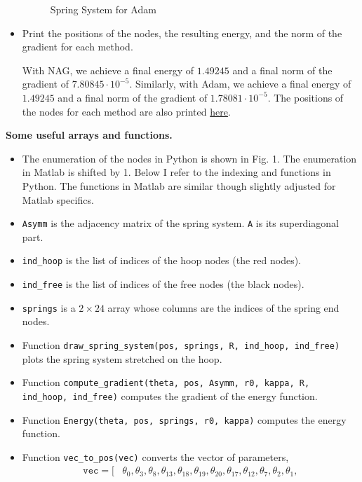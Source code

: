 \documentclass{../kin_math}
\begin{document}
\begin{questions}
\begin{itemize}
\begin{solution}
\begin{figure}
        \caption{Spring System for Adam}
      \end{figure}
    \end{solution}
    \item Print the positions of the nodes, the resulting energy, and the norm of the gradient for each method.
    \begin{solution}
      With NAG, we achieve a final energy of $1.49245$ and a final norm of the gradient of $7.80845 \cdot 10^{-5}$. Similarly, with Adam, we achieve a final energy of $1.49245$ and a final norm of the gradient of $1.78081 \cdot 10^{-5}$. The positions of the nodes for each method are also printed \href{https://github.com/elijahkin/amsc660/blob/main/final/final.ipynb}{here}.
    \end{solution}
  \end{itemize}
  \textbf{Some useful arrays and functions.}
  \begin{itemize}
    \item The enumeration of the nodes in Python is shown in Fig. 1. The enumeration in Matlab is shifted by 1. Below I refer to the indexing and functions in Python. The functions in Matlab are similar though slightly adjusted for Matlab specifics.
    \item \texttt{Asymm} is the adjacency matrix of the spring system. \texttt{A} is its superdiagonal part.
    \item \texttt{ind\_hoop} is the list of indices of the hoop nodes (the red nodes).
    \item \texttt{ind\_free} is the list of indices of the free nodes (the black nodes).
    \item \texttt{springs} is a $2 \times 24$ array whose columns are the indices of the spring end nodes.
    \item Function \texttt{draw\_spring\_system(pos, springs, R, ind\_hoop, ind\_free)} plots the spring system stretched on the hoop.
    \item Function \texttt{compute\_gradient(theta, pos, Asymm, r0, kappa, R, ind\_hoop, ind\_free)} computes the gradient of the energy function.
    \item Function \texttt{Energy(theta, pos, springs, r0, kappa)} computes the energy function.
    \item Function \texttt{vec\_to\_pos(vec)} converts the vector of parameters,
    \begin{align*}
      \texttt{vec} = [ &\theta_0, \theta_3, \theta_8, \theta_{13}, \theta_{18}, \theta_{19}, \theta_{20}, \theta_{17}, \theta_{12}, \theta_7, \theta_2, \theta_1, \\

\end{align*}
\end{itemize}
\end{questions}
\end{document}
